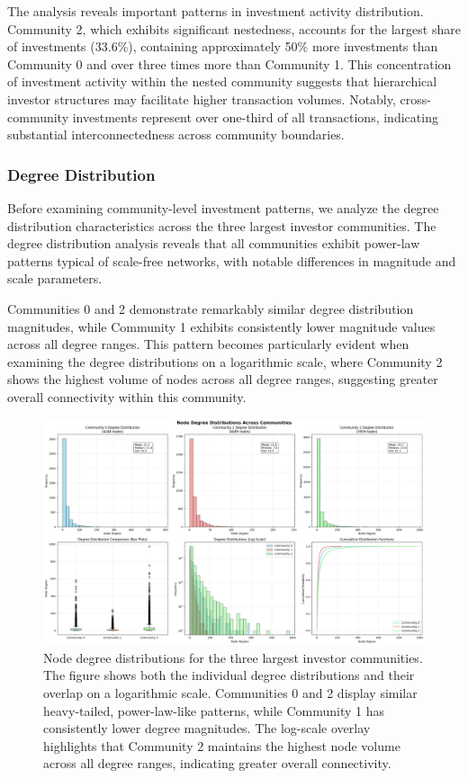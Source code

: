 The analysis reveals important patterns in investment activity distribution. Community 2, which exhibits significant nestedness, accounts for the largest share of investments (33.6\%), containing approximately 50\% more investments than Community 0 and over three times more than Community 1. This concentration of investment activity within the nested community suggests that hierarchical investor structures may facilitate higher transaction volumes. Notably, cross-community investments represent over one-third of all transactions, indicating substantial interconnectedness across community boundaries.

\subsubsection{Degree Distribution}

Before examining community-level investment patterns, we analyze the degree distribution characteristics across the three largest investor communities. The degree distribution analysis reveals that all communities exhibit power-law patterns typical of scale-free networks, with notable differences in magnitude and scale parameters.

Communities 0 and 2 demonstrate remarkably similar degree distribution magnitudes, while Community 1 exhibits consistently lower magnitude values across all degree ranges. This pattern becomes particularly evident when examining the degree distributions on a logarithmic scale, where Community 2 shows the highest volume of nodes across all degree ranges, suggesting greater overall connectivity within this community.

\begin{figure}[ht]
\centering
\includegraphics[width=1\textwidth]{./assets/node-degree-distributions-across-communities.png}
\caption{Node degree distributions for the three largest investor communities. The figure shows both the individual degree distributions and their overlap on a logarithmic scale. Communities 0 and 2 display similar heavy-tailed, power-law-like patterns, while Community 1 has consistently lower degree magnitudes. The log-scale overlay highlights that Community 2 maintains the highest node volume across all degree ranges, indicating greater overall connectivity.}
\label{fig:node_degree_distributions}
\end{figure}

